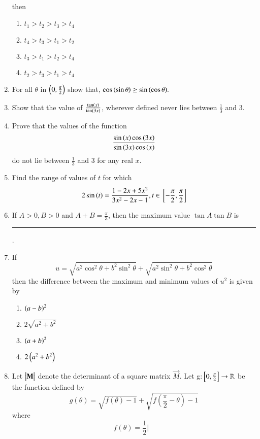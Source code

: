 \begin{enumerate}[label=\thesubsection.\arabic*,ref=\thesubsection.\theenumi]
\begin{align*}
\end{align*} then
\hfill{}
\begin{multicols}{4}
\begin{enumerate}
\item $t_1>t_2>t_3>t_4$
\item $t_4>t_3>t_1>t_2$
\item $t_3>t_1>t_2>t_4$
\item $t_2>t_3>t_1>t_4$
\end{enumerate}
\end{multicols}
\item For all $\theta$ in $\brak{0, \frac{\pi}{2}}$ show that, $\cos\brak{\sin\theta}\geq
\sin{\brak{\cos{\theta}}}.$ \hfill{}
\item Show that the value of  $\frac{\tan \brak{x}}{\tan \brak{3x}}$, wherever defined never lies between $\frac{1}{3}$ and $3$.
\hfill{}
\item Prove that the values of the function 
$$
\frac{\sin \brak{x} \cos \brak{3x}}{\sin \brak{3x} \cos \brak{x}}
$$
do not lie between $\frac{1}{3}$ and $3$ for any real $x$.
\hfill{}
\item Find the range of values of $t$ for which 
$$
2\sin \brak{t} = \frac{1-2x+5x^2}{3x^2-2x-1}
, t \in \sbrak{-\frac{\pi}{2},\frac{\pi}{2}}
$$
\hfill{}
    \item If $A > 0, B>0$ and $A + B = \frac{\pi}{3}$, then the maximum value $\tan A \tan B$ is  
\rule{1cm}{0.1pt}.
        \hfill{}
%
\item If
$$u=\sqrt{a^2 \cos^2 \theta+b^2 \sin^2 \theta}+\sqrt{a^2 \sin^2 \theta+b^2 \cos^2 \theta}$$
then the difference between the  maximum and minimum values of $u^2$ is given by \hfill{}
\begin{multicols}{4}
\begin{enumerate}
\item $\brak{a-b}^2$
\item $2\sqrt{a^2 +b^2}$
\item $\brak{a+b}^2$
\item $2\brak{a^2 +b^2}$
\end{enumerate}
\end{multicols}
 \item Let $\mydet{\vec{M}}$ denote the determinant of a square matrix $\vec{M}$. Let g:$\sbrak{0,\frac{\pi}{2}}\to\mathbb{R}$  be the function defined by
		$$g(\theta)=\sqrt{f(\theta)-1}+\sqrt{f(\frac{\pi}{2}-\theta)-1}$$ where
		$$f(\theta) = \frac{1}{2} \left| \begin{matrix}

\end{matrix}$$
\end{enumerate}
